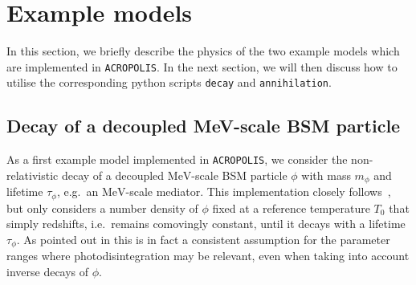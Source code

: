 \documentclass[11pt,a4paper]{article}
\begin{document}
\section{Example models}
\label{sec:example_models}

In this section, we briefly describe the physics of the two example models which are implemented in \texttt{ACROPOLIS}. In the next section, we will then discuss how to utilise the corresponding python scripts
\texttt{decay} and \texttt{annihilation}.

\subsection{Decay of a decoupled MeV-scale BSM particle}
\label{sec:decay_model}
As a first example model implemented in \texttt{ACROPOLIS}, we consider the non-relativistic decay of a decoupled $\mathrm{MeV}$-scale BSM particle $\phi$ with mass $m_\phi$ and lifetime $\tau_\phi$, e.g.\ an $\mathrm{MeV}$-scale mediator. This implementation closely follows~\cite{Hufnagel:2018bjp,Depta:2020zbh}, but only considers a number density of $\phi$ fixed at a reference temperature $T_0$ that simply redshifts, i.e.\ remains comovingly constant, until it decays with a lifetime $\tau_\phi$. As pointed out in \cite{Depta:2020zbh} this is in fact a consistent assumption for the parameter ranges where photodisintegration may be relevant, even when taking into account inverse decays of $\phi$.
\end{document}
